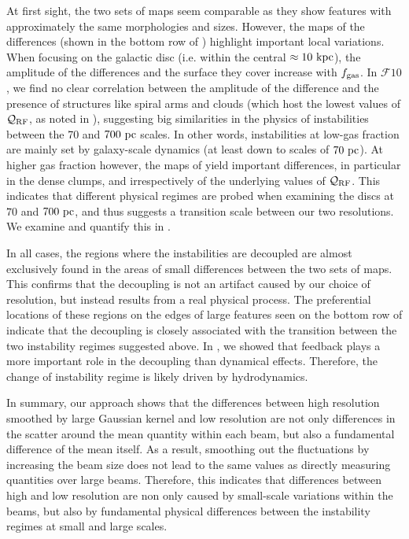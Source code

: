 \documentclass[useAMS,usenatbib]{mnras}
\newcommand{\fgas}{\ensuremath{f_{\rm gas}}\xspace}
\newcommand{\qrf}{\ensuremath{\mathcal{Q}_{\rm RF}}\xspace}
\newcommand{\gs}{\ensuremath{\mathcal{F}10}\xspace}
\begin{document}
At first sight, the two sets of maps seem comparable as they show features with approximately the same morphologies and sizes. However, the maps of the differences (shown in the bottom row of ) highlight important local variations. When focusing on the galactic disc (i.e. within the central $\approx 10 \mathrm{~kpc}$), the amplitude of the differences and the surface they cover increase with \fgas. In \gs, we find no clear correlation between the amplitude of the difference and the presence of structures like spiral arms and clouds (which host the lowest values of \qrf, as noted in ), suggesting big similarities in the physics of instabilities between the 70 and $700 \mathrm{~pc}$ scales. In other words, instabilities at low-gas fraction are mainly set by galaxy-scale dynamics (at least down to scales of $70 \mathrm{~pc}$). At higher gas fraction however, the maps of  yield important differences, in particular in the dense clumps, and irrespectively of the underlying values of \qrf. This indicates that different physical regimes are probed when examining the discs at $70$ and $700 \mathrm{~pc}$, and thus suggests a transition scale between our two resolutions. We examine and quantify this in .

In all cases, the regions where the instabilities are decoupled are almost exclusively found in the areas of small differences between the two sets of maps. This confirms that the decoupling is not an artifact caused by our choice of resolution, but instead results from a real physical process. The preferential locations of these regions on the edges of large features seen on the bottom row of  indicate that the decoupling is closely associated with the transition between the two instability regimes suggested above. In , we showed that feedback plays a more important role in the decoupling than dynamical effects. Therefore, the change of instability regime is likely driven by hydrodynamics.

In summary, our approach shows that the differences between high resolution smoothed by large Gaussian kernel and low resolution are not only differences in the scatter around the mean quantity within each beam, but also a fundamental difference of the mean itself. As a result, smoothing out the fluctuations by increasing the beam size does not lead to the same values as directly measuring quantities over large beams. Therefore, this indicates that differences between high and low resolution are non only caused by small-scale variations within the beams, but also by fundamental physical differences between the instability regimes at small and large scales.
\end{document}
